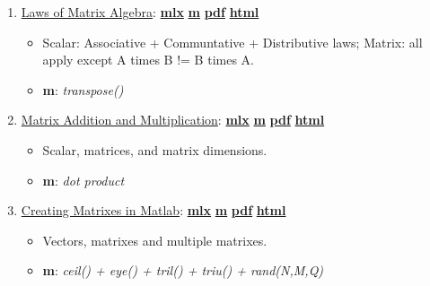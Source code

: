 \documentclass[
]{book}
\providecommand{\tightlist}{%
  \setlength{\itemsep}{0pt}\setlength{\parskip}{0pt}}
\begin{document}
\begin{enumerate}
\def\labelenumi{\arabic{enumi}.}
\tightlist
\item
  \href{https://fanwangecon.github.io/Math4Econ/matrix_basics/htmlpdfm/matlab_define_matrix.html}{Laws of Matrix Algebra}: \href{https://github.com/FanWangEcon/Math4Econ/blob/master/matrix_basics/matlab_define_matrix.mlx}{\textbf{mlx}} \textbar{} \href{https://github.com/FanWangEcon/Math4Econ/blob/master/matrix_basics/htmlpdfm/matlab_define_matrix.m}{\textbf{m}} \textbar{} \href{https://github.com/FanWangEcon/Math4Econ/blob/master/matrix_basics/htmlpdfm/matlab_define_matrix.pdf}{\textbf{pdf}} \textbar{} \href{https://fanwangecon.github.io/Math4Econ/matrix_basics/htmlpdfm/matlab_define_matrix.html}{\textbf{html}}

  \begin{itemize}
  \tightlist
  \item
    Scalar: Associative + Communtative + Distributive laws; Matrix: all apply except A times B != B times A.
  \item
    \textbf{m}: \emph{transpose()}
  \end{itemize}
\item
  \href{https://fanwangecon.github.io/Math4Econ/matrix_basics/htmlpdfm/matrix_algebra_rules.html}{Matrix Addition and Multiplication}: \href{https://github.com/FanWangEcon/Math4Econ/blob/master/matrix_basics/matrix_algebra_rules.mlx}{\textbf{mlx}} \textbar{} \href{https://github.com/FanWangEcon/Math4Econ/blob/master/matrix_basics/htmlpdfm/matrix_algebra_rules.m}{\textbf{m}} \textbar{} \href{https://github.com/FanWangEcon/Math4Econ/blob/master/matrix_basics/htmlpdfm/matrix_algebra_rules.pdf}{\textbf{pdf}} \textbar{} \href{https://fanwangecon.github.io/Math4Econ/matrix_basics/htmlpdfm/matrix_algebra_rules.html}{\textbf{html}}

  \begin{itemize}
  \tightlist
  \item
    Scalar, matrices, and matrix dimensions.
  \item
    \textbf{m}: \emph{dot product}
  \end{itemize}
\item
  \href{https://fanwangecon.github.io/Math4Econ/matrix_basics/htmlpdfm/matrix_matlab.html}{Creating Matrixes in Matlab}: \href{https://github.com/FanWangEcon/Math4Econ/blob/master/matrix_basics/matrix_matlab.mlx}{\textbf{mlx}} \textbar{} \href{https://github.com/FanWangEcon/Math4Econ/blob/master/matrix_basics/htmlpdfm/matrix_matlab.m}{\textbf{m}} \textbar{} \href{https://github.com/FanWangEcon/Math4Econ/blob/master/matrix_basics/htmlpdfm/matrix_matlab.pdf}{\textbf{pdf}} \textbar{} \href{https://fanwangecon.github.io/Math4Econ/matrix_basics/htmlpdfm/matrix_matlab.html}{\textbf{html}}

  \begin{itemize}
  \tightlist
  \item
    Vectors, matrixes and multiple matrixes.
  \item
    \textbf{m}: \emph{ceil() + eye() + tril() + triu() + rand(N,M,Q)}
  \end{itemize}
\end{enumerate}
\end{document}
